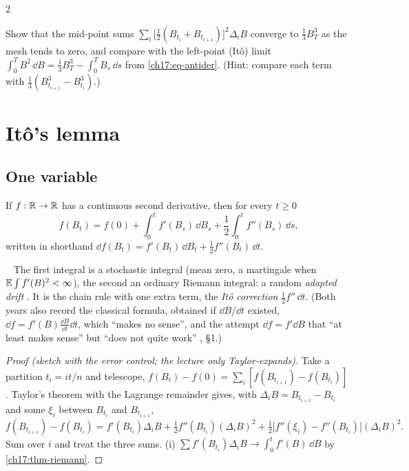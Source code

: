 \begin{paracol}{2}
\begin{exercise}\label{ch17:ex-x1}
Show that the mid-point sums $\sum_i\bigl[\tfrac12(B_{t_i}+B_{t_{i+1}})\bigr]^{2}\Delta_iB$ converge to $\tfrac13B_T^3$ as the mesh tends to zero, and compare with the left-point (It\^o) limit $\int_0^TB^2\,\dd B=\tfrac13B_T^3-\int_0^TB_s\,\dd s$ from \eqref{ch17:eq-antider}. (Hint: compare each term with $\tfrac13(B_{t_{i+1}}^3-B_{t_i}^3)$.)
\end{exercise}

\section{It\^o's lemma}\label{ch17:sec-lemma}

\subsection{One variable}\label{ch17:sec-lemma1}
\begin{theorem}\label{ch17:thm-ito1}
If $f:\mathbb{R}\to\mathbb{R}$ has a continuous second derivative, then for every $t\ge0$
\begin{equation}\label{ch17:eq-ito1}
  f(B_t)=f(0)+\int_0^tf'(B_s)\,\dd B_s+\frac12\int_0^tf''(B_s)\,\dd s,
\end{equation}
written in shorthand $\dd f(B_t)=f'(B_t)\,\dd B_t+\tfrac12f''(B_t)\,\dd t$.
\end{theorem}
\ \noindent
The first integral is a stochastic integral (mean zero, a martingale when $\mathbb{E}\int f'(B)^2<\infty$), the second an ordinary Riemann integral: a
random \emph{adapted drift} . It is the chain rule with one extra term, the \emph{It\^o correction} $\tfrac12f''\,\dd t$.
(Both years also record the classical formula, obtained if $\dd B/\dd t$ existed, $\dd f=f'(B)\tfrac{\dd B}{\dd t}\dd t$, which ``makes no sense'', and the
attempt $\dd f=f'\dd B$ that ``at least makes sense'' but ``does not quite work'' , \S1.)

\begin{proof}[Proof (sketch with the error control; the lecture only Taylor-expands)]
Take a partition $t_i=it/n$ and telescope, $f(B_t)-f(0)=\sum_i[f(B_{t_{i+1}})-f(B_{t_i})]$ . Taylor's theorem with the Lagrange remainder gives, with $\Delta_iB=B_{t_{i+1}}-B_{t_i}$
and some $\xi_i$ between $B_{t_i}$ and $B_{t_{i+1}}$,
\[
  f(B_{t_{i+1}})-f(B_{t_i})=f'(B_{t_i})\Delta_iB+\tfrac12f''(B_{t_i})(\Delta_iB)^2+\tfrac12\bigl[f''(\xi_i)-f''(B_{t_i})\bigr](\Delta_iB)^2 .
\]
Sum over $i$ and treat the three sums.
(i) $\sum f'(B_{t_i})\Delta_iB\to\int_0^tf'(B)\,\dd B$ by \cref{ch17:thm-riemann}.


\end{proof}
\end{paracol}
